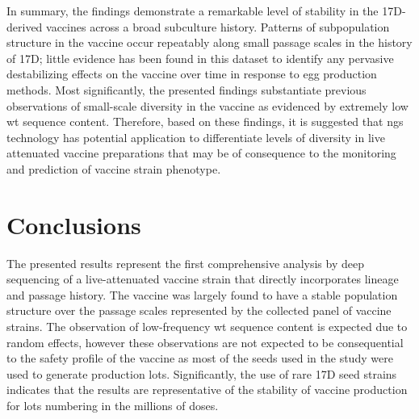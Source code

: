 In summary, the findings demonstrate a remarkable level of stability in the 17D-derived vaccines across a broad subculture history. Patterns of subpopulation structure in the vaccine occur repeatably along small passage scales in the history of 17D; little evidence has been found in this dataset to identify any pervasive destabilizing effects on the vaccine over time in response to egg production methods. Most significantly, the presented findings substantiate previous observations of small-scale diversity in the vaccine as evidenced by extremely low \gls{wt} sequence content. Therefore, based on these findings, it is suggested that \gls{ngs} technology has potential application to differentiate levels of diversity in live attenuated vaccine preparations that may be of consequence to the monitoring and prediction of vaccine strain phenotype.
	
\section{Conclusions}
The presented results represent the first comprehensive analysis by deep sequencing of a live-attenuated vaccine strain that directly incorporates lineage and passage history. The vaccine was largely found to have a stable population structure over the passage scales represented by the collected panel of vaccine strains. The observation of low-frequency \gls{wt} sequence content is expected due to random effects, however these observations are not expected to be consequential to the safety profile of the vaccine as most of the seeds used in the study were used to generate production lots. Significantly, the use of rare 17D seed strains indicates that the results are representative of the stability of vaccine production for lots numbering in the millions of doses.
\clearpage


\begin{table}
	\centering
	\caption{Origin information for the seeds used in the study.}
	\begin{ThreePartTable}
		
		\begin{tablenotes}
			\item[]
		\end{tablenotes}
	\end{ThreePartTable}
	\label{origin_seeds}
\end{table}
\clearpage



